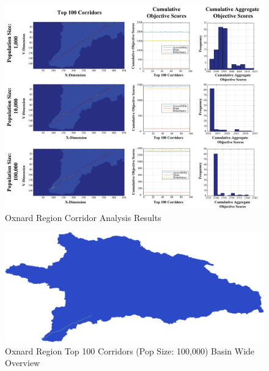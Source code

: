         \begin{figure}[!h]
            \begin{center}
            \includegraphics[width=6in]{figures/Oxnard_PathwayResults.png}   
            \caption{Oxnard Region Corridor Analysis Results}
            \label{fig:Oresults}
            \end{center}
        \end{figure}

        \begin{figure}[!h]
            \begin{center}
            \includegraphics[width=5.5in]{figures/Oxnard_PathwayLarge.png}   
            \caption{Oxnard Region Top 100 Corridors (Pop Size: 100,000) Basin Wide Overview}
            \label{fig:OsolutionOverview}
            \end{center}
        \end{figure}
        
